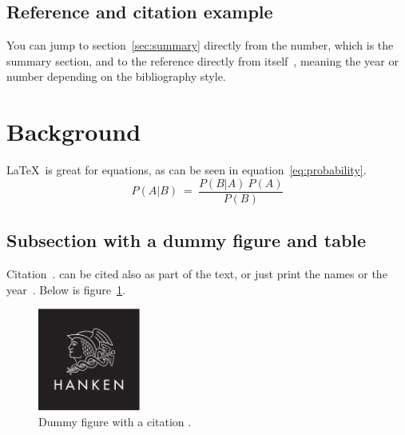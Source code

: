 \documentclass[12pt, a4paper, oneside]{article}
\begin{document}
\subsection{Reference and citation example} \label{subsec:reference-and-citation-example}

You can jump to section~\ref{sec:summary} directly from the number, which is the summary section,
and to the reference directly from itself~\citep{vet2007ophthal},
meaning the year or number depending on the bibliography style.

\clearpage


\section{Background} \label{sec:background}

\blindtext

\LaTeX~is great for equations, as can be seen in equation~\ref{eq:probability}.
\begin{equation} \label{eq:probability}
    P(A | B) \ = \ \frac{P(B | A) \ P(A)}{P(B)}
\end{equation}

\subsection{Subsection with a dummy figure and table} \label{subsec:subsection-with-a-dummy-figure-and-table}

Citation~\citep{hermanson2020anatomy, petersen2005advances}.
\citet{petersen2005advances} can be cited also as part of the text,
or just print the names \citeauthor{petersen2005advances} or the year~\citeyear{petersen2005advances}.
Below is figure~\ref{fig:figure}.

\begin{figure}[h]
    \centering
    \includegraphics[width=0.3\textwidth]{hanken_logo_platta}
    \caption[Dummy figure]{Dummy figure with a citation \citep{mellersh2014genetics}.}
    \label{fig:figure}
\end{figure}
\end{document}
